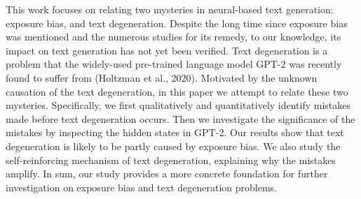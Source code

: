 This work focuses on relating two mysteries in neural-based text generation: exposure bias, and text degeneration. Despite the long time since exposure bias was mentioned and the numerous studies for its remedy, to our knowledge, its impact on text generation has not yet been verified. Text degeneration is a problem that the widely-used pre-trained language model GPT-2 was recently found to suffer from (Holtzman et al., 2020). Motivated by the unknown causation of the text degeneration, in this paper we attempt to relate these two mysteries. Specifically, we first qualitatively and quantitatively identify mistakes made before text degeneration occurs. Then we investigate the significance of the mistakes by inspecting the hidden states in GPT-2. Our results show that text degeneration is likely to be partly caused by exposure bias. We also study the self-reinforcing mechanism of text degeneration, explaining why the mistakes amplify. In sum, our study provides a more concrete foundation for further investigation on exposure bias and text degeneration problems.
